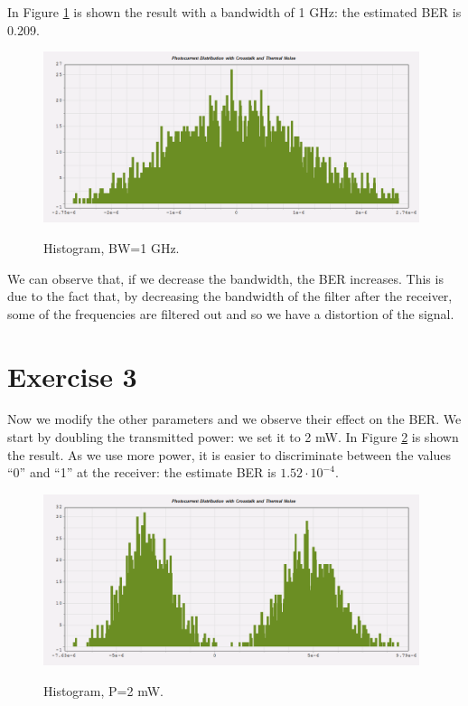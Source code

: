 \documentclass[a4paper,10pt]{report}
\begin{document}
In Figure \ref{ex2_3} is shown the result with a bandwidth of 1 GHz: the estimated BER is 0.209.

\begin{figure}[!ht]
   \centering
   \includegraphics[width=11cm]{ex2_3.png}\\
   \caption{Histogram, BW=1 GHz.}
   \label{ex2_3}
\end{figure}

We can observe that, if we decrease the bandwidth, the BER increases. This is due to the fact that, by decreasing the bandwidth of the filter
after the receiver, some of the frequencies are filtered out and so we have a distortion of the signal.

\newpage
\section*{Exercise 3}
Now we modify the other parameters and we observe their effect on the BER.
We start by doubling the transmitted power: we set it to 2 mW. In Figure \ref{ex3_1} is shown the result.
As we use more power, it is easier to discriminate between the values ``0'' and ``1'' at the receiver: the estimate BER is $1.52 \cdot 10^{-4}$.

\begin{figure}[!ht]
   \centering
   \includegraphics[width=11cm]{ex3_1.png}\\
   \caption{Histogram, P=2 mW.}
   \label{ex3_1}
\end{figure}
\end{document}
